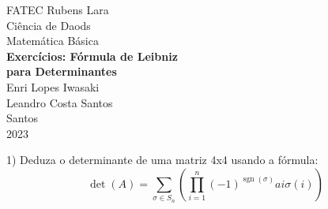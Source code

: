\documentclass[12pt]{article}
\begin{document}
\begin{titlepage} 
\begin{center} 
    {\large FATEC Rubens Lara}\\[0.2cm] 
    {\large Ci\^{e}ncia de Daods}\\[0.2cm]
    {\large Matem\'{a}tica B\'{a}sica}\\[4.1cm]
    {\bf \huge Exerc\'{i}cios: F\'{o}rmula de Leibniz}\\[0.4cm]
    {\bf \huge para Determinantes}\\[4.1cm] 
    {\large Enri Lopes Iwasaki}\\[0.5cm] 
    {\large Leandro Costa Santos}\\[4.7cm]
    {\large Santos}\\[0.2cm]
    {\large 2023}
\end{center}
\end{titlepage}


1) Deduza o determinante de uma matriz 4x4 usando a f\'{o}rmula: \\[0.5cm]
{\large $$\operatorname{det}(A)=\sum_{\sigma \in S_{n}}  \left(\prod_{i=1}^{n} (-1)^ {\operatorname{sgn}(\sigma)} ai \sigma (i) \right)$$ } \\

\end{document}
